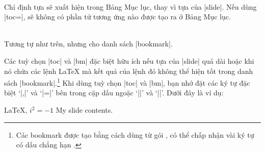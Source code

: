 \begin{description}
\item{}\\
Chỉ định tựa sẽ xuất hiện trong Bảng Mục lục, thay vì tựa của |slide|.
Nếu dùng |toc=|, sẽ không có phần tử tương ứng nào được tạo ra ở
Bảng Mục lục.
\item{}\\
Tương tự như trên, nhưng cho danh sách |bookmark|.
\end{description}

Các tuỳ chọn |toc| và |bm| đặc biệt hữu ích nếu tựa của |slide|
quá dài hoặc khi nó chứa các lệnh \LaTeX{} mà kết quả của lệnh đó
không thể hiện tốt trong danh sách |bookmark|.\footnote{Các bookmark
được tạo bằng cách dùng  từ gói ,
có thể chấp nhận vài ký tự có dấu chẳng hạn .}
Khi dùng tuỳ chọn |toc| và |bm|, bạn nhớ đặt các ký tự đặc biệt
`|,|' và `|=|' bên trong cặp dấu ngoặc `|{|' và `|}|'. Dưới đây là ví dụ:

\begin{example}
 \begin{slide}[toc=,bm={LaTeX, i*i=-1}]{\color{red}\LaTeX, $i^2=-1$}
   My slide contents.
 \end{slide}
\end{example}

